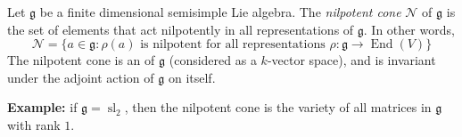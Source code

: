 \documentclass[12pt]{article}
\newcommand{\fg}{\mathfrak{g}}
\newcommand{\cN}{\mathcal{N}}
\begin{document}
Let $\fg$ be a finite dimensional semisimple Lie algebra. The
\emph{nilpotent cone} $\cN$ of $\fg$ is the set of elements that
act nilpotently in all representations of $\fg$. In other words,
$$\cN=\{ a\in \fg : \rho(a) \text{ is nilpotent for all representations } \rho:\fg\to \operatorname{End}(V)\}$$
The nilpotent cone is an 
 of $\fg$ (considered as a
$k$-vector space),  and is invariant under the adjoint action of $\fg$
on itself.  

\textbf{Example:} if $\fg=\operatorname{sl}_2$, then the nilpotent cone
is the variety of all matrices in $\fg$ with rank $1$.
\end{document}
